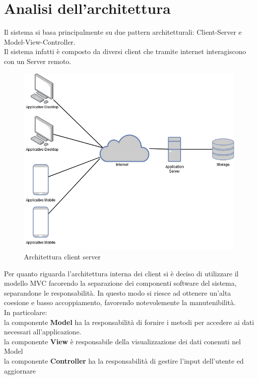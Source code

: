 \section{Analisi dell'architettura}
Il sistema si basa principalmente su due pattern architetturali: Client-Server e Model-View-Controller.\\
Il sistema infatti è composto da diversi client che tramite internet interagiscono con un Server remoto.
\begin{center}
    \begin{figure}[H]
        \includegraphics[width=\textwidth]{Figures/Architettura client server.png}
        \caption{Architettura client server}
    \end{figure}
\end{center}
Per quanto riguarda l'architettura interna dei client si è deciso di utilizzare il modello MVC
facorendo la separazione dei componenti software del sistema, separandone le responsabilità.
In questo modo si riesce ad ottenere un'alta coesione e basso accoppiamento, favorendo notevolemente
la manutenibilità.\\
In particolare:\\
 la componente \textbf{Model} ha la responsabilità di fornire i metodi per accedere
ai dati necessari all'applicazione.\\
la componente \textbf{View} è responsabile della visualizzazione dei dati conenuti nel Model\\
la componente \textbf{Controller} ha la responsabilità di gestire l'input dell'utente ed aggiornare 
